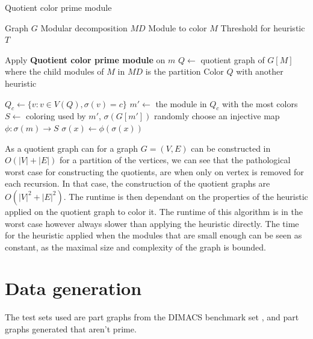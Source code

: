 \documentclass[a4paper]{article}
\begin{document}
\begin{algorithm}[H]
  \caption{Quotient color prime module}
  \begin{algorithmic}[1]
    \REQUIRE Graph $G$
    \REQUIRE Modular decomposition $MD$
    \REQUIRE Module to color $M$
    \REQUIRE Threshold for heuristic $T$

    \ENDIF
        \STATE Apply \textbf{Quotient color prime module} on $m$
    \ENDFOR
    \STATE $Q \leftarrow $ quotient graph of $G[M]$ where the child modules of $M$ in $MD$ is the partition
    \STATE Color $Q$ with another heuristic

        \STATE $Q_c \leftarrow \{ v : v \in V(Q), \sigma(v) = c\}$
        \STATE $m' \leftarrow$ the module in $Q_c$ with the most colors
        \STATE $S \leftarrow$ coloring used by $m'$, $\sigma(G[m'])$
            \STATE randomly choose an injective map $\phi:\sigma(m)\to S$
                \STATE $\sigma(x) \leftarrow \phi(\sigma(x))$
            \ENDFOR
        \ENDFOR
    \ENDFOR

  \end{algorithmic}
\end{algorithm}

As a quotient graph can for a graph $G = (V,E)$ can be constructed in
$O(|V|+|E|)$ for a partition of the vertices, we can see that the pathological
worst case for constructing the quotients, are when only on vertex is removed
for each recursion. In that case, the construction of the quotient graphs are
$O(|V|^2+|E|^2)$. The runtime is then dependant on the properties of the
heuristic applied on the quotient graph to color it. The runtime of this
algorithm is in the worst case however always slower than applying the heuristic
directly. The time for the heuristic applied when the modules that are small
enough can be seen as constant, as the maximal size and complexity of the graph
is bounded. 

\section{Data generation}
\label{sec:Data}

The test sets used are part graphs from the DIMACS benchmark set \cite{DIMACS}, 
and part graphs generated that aren't prime.
\end{document}
